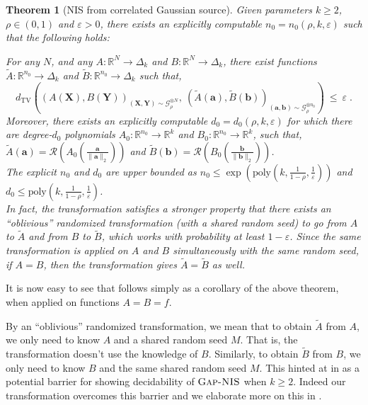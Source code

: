 \documentclass[11pt]{article}
\newcommand{\inparen}[1]{\left ( #1 \right )}
\newcommand{\wtilde}[1]{\widetilde{#1}}
\newcommand{\dTV}{d_{\mathrm{TV}}}
\newcommand{\eps}{\varepsilon}
\newcommand{\bbR}{{\mathbb R}}
\newcommand{\ba}{{\bm a}}
\newcommand{\bb}{{\bm b}}
\newcommand{\bX}{\mathbf{X}}
\newcommand{\bY}{\mathbf{Y}}
\newcommand{\calG}{\mathcal{G}}
\newcommand{\calR}{\mathcal{R}}
\newcommand{\poly}{\mathrm{poly}}
\newtheorem{theorem}{Theorem}[section]
\newcommand{\ANIS}{\text{\sc Gap-NIS}}
\begin{document}
\begin{theorem}[NIS from correlated Gaussian source]\label{th:NIS_Gaussian_src}
	Given parameters $k \ge 2$, $\rho \in (0,1)$ and $\eps > 0$, there exists an explicitly computable $n_0 = n_0(\rho, k, \eps)$ such that the following holds:
	
	\noindent For any $N$, and any $A : \bbR^N \to \Delta_k$ and $B : \bbR^N \to \Delta_k$, there exist functions $\wtilde{A} : \bbR^{n_0} \to \Delta_k$ and $\wtilde{B} : \bbR^{n_0} \to \Delta_k$ such that,
	\[\dTV\inparen{(A(\bX),B(\bY))_{(\bX,\bY) \sim \calG_\rho^{\otimes N}},\ (\wtilde{A}(\ba), \wtilde{B}(\bb))_{(\ba, \bb) \sim \calG_\rho^{\otimes n_0}}} ~\le~ \eps\;.\]
	Moreover, there exists an explicitly computable $d_0 = d_0(\rho, k, \eps)$ for which there are degree-$d_0$ polynomials $A_0 : \bbR^{n_0} \to \bbR^k$ and $B_0 : \bbR^{n_0} \to \bbR^k$, such that, $\wtilde{A}(\ba) = \calR\inparen{A_0\inparen{\frac{\ba}{\|\ba\|_2}}}$ and $\wtilde{B}(\bb) = \calR\inparen{B_0\inparen{\frac{\bb}{\|\bb\|_2}}}$.\\
	The explicit $n_0$ and $d_0$ are upper bounded as $n_0 \le \exp \inparen{\poly\inparen{k, \frac{1}{1-\rho}, \frac{1}{\eps}}}$ and $d_0 \le \poly\inparen{k, \frac{1}{1-\rho}, \frac{1}{\eps}}$.\\
	
	\noindent In fact, the transformation satisfies a stronger property that there exists an ``oblivious'' randomized transformation (with a shared random seed) to go from $A$ to $\wtilde{A}$ and from $B$ to $\wtilde{B}$, which works with probability at least $1-\eps$. Since the same transformation is applied on $A$ and $B$ simultaneously with the same random seed, if $A = B$, then the transformation gives $\wtilde{A}=\wtilde{B}$ as well.
\end{theorem}

\noindent It is now easy to see that  follows simply as a corollary of the above theorem, when applied on functions $A = B = f$.

By an ``oblivious'' randomized transformation, we mean that to obtain $\wtilde{A}$ from $A$, we only need to know $A$ and a shared random seed $M$. That is, the transformation doesn't use the knowledge of $B$. Similarly, to obtain $\wtilde{B}$ from $B$, we only need to know $B$ and the same shared random seed $M$. This hinted at in \cite{GKS_NIS_decidable} as a potential barrier for showing decidability of $\ANIS$ when $k \ge 2$. Indeed our transformation overcomes this barrier and we elaborate more on this in .
\end{document}
